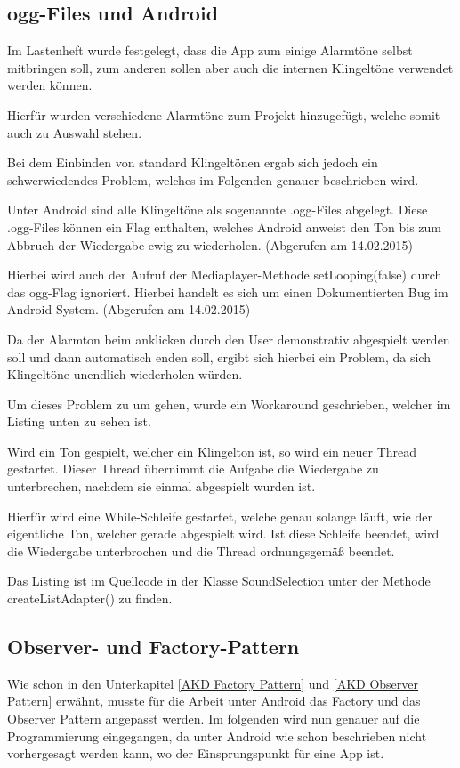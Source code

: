 
\cite{PlacesExample}

\subsection{ogg-Files und Android}
Im Lastenheft wurde festgelegt, dass die App zum einige Alarmt\"one selbst mitbringen soll, zum anderen sollen aber auch die internen Klingelt\"one verwendet werden k\"onnen.

Hierf\"ur wurden verschiedene Alarmt\"one zum Projekt hinzugef\"ugt, welche somit auch zu Auswahl stehen.

Bei dem Einbinden von standard Klingelt\"onen ergab sich jedoch ein schwerwiedendes Problem, welches im Folgenden genauer beschrieben wird.

Unter Android sind alle Klingelt\"one als sogenannte .ogg-Files abgelegt. Diese .ogg-Files k\"onnen ein Flag enthalten, welches Android anweist den Ton bis zum Abbruch der Wiedergabe ewig zu wiederholen. 
\cite{oogStackOver} (Abgerufen am 14.02.2015)

Hierbei wird auch der Aufruf der Mediaplayer-Methode setLooping(false) durch das ogg-Flag ignoriert. Hierbei handelt es sich um einen Dokumentierten Bug im Android-System.
\cite{oggBug} (Abgerufen am 14.02.2015)

Da der Alarmton beim anklicken durch den User demonstrativ abgespielt werden soll und dann automatisch enden soll, ergibt sich hierbei ein Problem, da sich Klingelt\"one unendlich wiederholen w\"urden.

Um dieses Problem zu um gehen, wurde ein Workaround geschrieben, welcher im Listing unten zu sehen ist.

Wird ein Ton gespielt, welcher ein Klingelton ist, so wird ein neuer Thread gestartet. Dieser Thread \"ubernimmt die Aufgabe die Wiedergabe zu unterbrechen, nachdem sie einmal abgespielt wurden ist.

Hierf\"ur wird eine While-Schleife gestartet, welche genau solange l\"auft, wie der eigentliche Ton, welcher gerade abgespielt wird. Ist diese Schleife beendet, wird die Wiedergabe unterbrochen und die Thread ordnungsgem\"a\ss{} beendet.

Das Listing ist im Quellcode in der Klasse SoundSelection unter der Methode createListAdapter() zu finden.



\subsection{Observer- und Factory-Pattern}
Wie schon in den Unterkapitel \ref{AKD Factory Pattern} und \ref{AKD Observer Pattern} erw\"ahnt, musste f\"ur die Arbeit unter Android das Factory und das Observer Pattern angepasst werden. Im folgenden wird nun genauer auf die Programmierung eingegangen, da unter Android wie schon beschrieben nicht vorhergesagt werden kann, wo der Einsprungspunkt f\"ur eine App ist.

